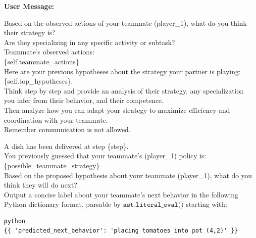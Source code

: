 \documentclass{article} %
\begin{document}
\begin{tcolorbox}[
    title={\small \textbf{Infer Teammate Strategy Message}},
    width=\linewidth, %
    fontupper=\fontsize{9pt}{11pt}\selectfont\ttfamily,
    before skip=10pt,
    after skip=0pt
]%

\textbf{User Message:}

Based on the observed actions of your teammate (player\_1), what do you think their strategy is?\\
Are they specializing in any specific activity or subtask?\\

Teammate's observed actions:\\
\{self.teammate\_actions\}\\

Here are your previous hypotheses about the strategy your partner is playing: \{self.top\_hypotheses\}.\\

Think step by step and provide an analysis of their strategy, any specialization you infer from their behavior, and their competence.\\
Then analyze how you can adapt your strategy to maximize efficiency and coordination with your teammate.\\
Remember communication is not allowed.\\

\end{tcolorbox}


\begin{tcolorbox}[
    title={\small \textbf{Predict Teammate Behavior Message}},
    width=\linewidth, %
    fontupper=\fontsize{9pt}{11pt}\selectfont\ttfamily,
    before skip=0pt,
    after skip=0pt
]%

A dish has been delivered at step \{step\}.\\
You previously guessed that your teammate's (player\_1) policy is: \{possible\_teammate\_strategy\}\\
Based on the proposed hypothesis about your teammate (player\_1), what do you think they will do next?\\
Output a concise label about your teammate's next behavior in the following Python dictionary format, parsable by $\texttt{ast.literal\_eval()}$ starting with:
\begin{verbatim}
python
{{ 'predicted_next_behavior': 'placing tomatoes into pot (4,2)' }}
\end{verbatim}

\end{tcolorbox}
\end{document}
